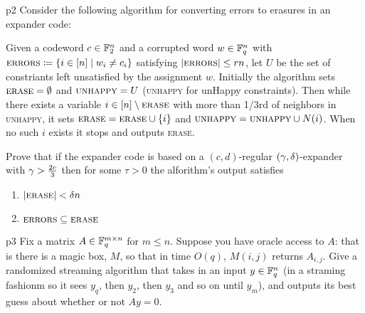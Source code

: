 \documentclass[a4paper, 11pt]{article}
\begin{document}
\begin{problem}{%
}{p2%
}
Consider the following algorithm for converting errors to erasures in an expander code:

Given a codeword $c\in \mathbb{F}_2^n$ and a corrupted word $w\in \mathbb{F}_q^n$ with $\textsc{errors}\coloneqq \{i\in [n]\mid w_i\neq c_i\}$  satisfying $|\textsc{errors}|\leq rn$, let $U$ be the set of constriants left unsatisfied by the assignment $w$. Initially the algorithm sets $\textsc{erase}=\emptyset$ and $\textsc{unhappy}=U$ (\textsc{unhappy} for unHappy constraints). Then while there exists a variable $i\in [n]\setminus \textsc{erase}$ with more than 1/3rd of neighbors in \textsc{unhappy}, it sets $\textsc{erase}=\textsc{erase}\cup \{i\}$ and $\textsc{unhappy}=\textsc{unhappy}\cup N(i)$. When no such $i$ exists it stops and outputs \textsc{erase}.

Prove that if the expander code is based on a $(c,d)$-regular $(\gamma,\delta)$-expander with $\gamma> \frac{2c}{3}$ then for some $\tau>0$ the alforithm's output satisfies \begin{enumerate}[label=(\arabic*)]
	\item $|\textsc{erase}|<\delta n$
	\item $\textsc{errors}\subseteq \textsc{erase}$
\end{enumerate}
\end{problem}

\solve{

}

\begin{problem}{%
	}{p3%
	}
Fix a matrix $A\in \mathbb{F}_q^{m\times n}$ for $m\leq n$. Suppose you have oracle access to $A$: that is  there is a magic box, $M$, so that in time $O(q)$, $M(i,j)$ returns $A_{i,j}$. Give a randomized streaming algorithm that takes in an input $y\in \mathbb{F}_q^n$ (in a straming fashionm so it sees $y_q$, then $y_2$, then $y_3$ and so on until $y_m$), and outputs its best guess about whether or not $Ay=0$.
\end{problem}

\solve{
}
\end{document}
